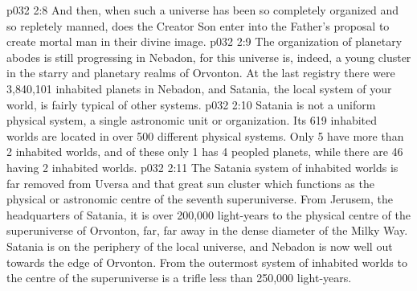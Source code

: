 \vs p032 2:8 And then, when such a universe has been so completely organized and so repletely manned, does the Creator Son enter into the Father’s proposal to create mortal man in their divine image.
\vs p032 2:9 \pc The organization of planetary abodes is still progressing in Nebadon, for this universe is, indeed, a young cluster in the starry and planetary realms of Orvonton. At the last registry there were 3,840,101 inhabited planets in Nebadon, and Satania, the local system of your world, is fairly typical of other systems.
\vs p032 2:10 Satania is not a uniform physical system, a single astronomic unit or organization. Its 619 inhabited worlds are located in over 500 different physical systems. Only 5 have more than 2 inhabited worlds, and of these only 1 has 4 peopled planets, while there are 46 having 2 inhabited worlds.
\vs p032 2:11 The Satania system of inhabited worlds is far removed from Uversa and that great sun cluster which functions as the physical or astronomic centre of the seventh superuniverse. From Jerusem, the headquarters of Satania, it is over 200,000 light\hyp{}years to the physical centre of the superuniverse of Orvonton, far, far away in the dense diameter of the Milky Way. Satania is on the periphery of the local universe, and Nebadon is now well out towards the edge of Orvonton. From the outermost system of inhabited worlds to the centre of the superuniverse is a trifle less than 250,000 light\hyp{}years.

